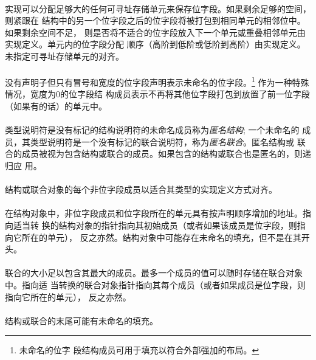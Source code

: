 \paragraph{}
实现可以分配足够大的任何可寻址存储单元来保存位字段。如果剩余足够的空间，则紧跟在
结构中的另一个位字段之后的位字段将被打包到相同单元的相邻位中。如果剩余空间不足，
则是否将不适合的位字段放入下一个单元或重叠相邻单元由实现定义。单元内的位字段分配
顺序（高阶到低阶或低阶到高阶）由实现定义。未指定可寻址存储单元的对齐。

\paragraph{}
没有声明子但只有冒号和宽度的位字段声明表示未命名的位字段。\footnote{未命名的位字
段结构成员可用于填充以符合外部强加的布局。} 作为一种特殊情况，宽度为0的位字段结
构成员表示不再将其他位字段打包到放置了前一位字段（如果有的话）的单元中。

\paragraph{}
类型说明符是没有标记的结构说明符的未命名成员称为\textit{匿名结构}; 一个未命名的
成员，其类型说明符是一个没有标记的联合说明符，称为\textit{匿名联合}。匿名结构或
联合的成员被视为包含结构或联合的成员。如果包含的结构或联合也是匿名的，则递归应
用。

\paragraph{}
结构或联合对象的每个非位字段成员以适合其类型的实现定义方式对齐。

\paragraph{}
在结构对象中，非位字段成员和位字段所在的单元具有按声明顺序增加的地址。指向适当转
换的结构对象的指针指向其初始成员（或者如果该成员是位字段，则指向它所在的单元），
反之亦然。结构对象中可能存在未命名的填充，但不是在其开头。

\paragraph{}
联合的大小足以包含其最大的成员。最多一个成员的值可以随时存储在联合对象中。指向适
当转换的联合对象指针指向其每个成员（或者如果成员是位字段，则指向它所在的单元），
反之亦然。

\paragraph{}
结构或联合的末尾可能有未命名的填充。

